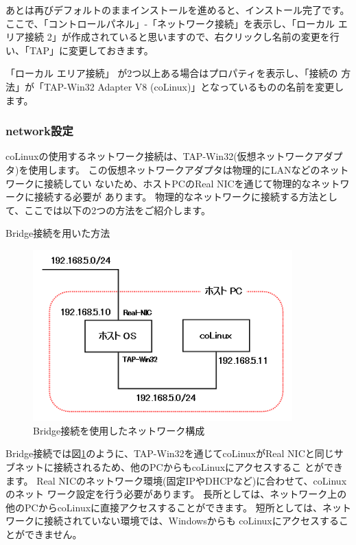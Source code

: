 \documentclass[mingoth,a4paper]{jsarticle}
\begin{document}
あとは再びデフォルトのままインストールを進めると、インストール完了です。
ここで、「コントロールパネル」-「ネットワーク接続」を表示し、「ローカル
エリア接続 2」が作成されていると思いますので、右クリックし名前の変更を行
い、「TAP」に変更しておきます。

「ローカル エリア接続」 が2つ以上ある場合はプロパティを表示し、「接続の
方法」が「TAP-Win32 Adapter V8 (coLinux)」となっているものの名前を変更し
ます。

\subsubsection{network設定}
coLinuxの使用するネットワーク接続は、TAP-Win32(仮想ネットワークアダプタ)を使用します。
この仮想ネットワークアダプタは物理的にLANなどのネットワークに接続してい
ないため、ホストPCのReal NICを通じて物理的なネットワークに接続する必要が
あります。
物理的なネットワークに接続する方法として、ここでは以下の2つの方法をご紹介します。

Bridge接続を用いた方法

\begin{figure}[htbp]
 \begin{center}
  \includegraphics[width=100mm]{image200804/colinux_bridge.png}
 \end{center}
 \caption{Bridge接続を使用したネットワーク構成}
 \label{fig:bridge}
\end{figure}

Bridge接続では図\ref{fig:bridge}のように、TAP-Win32を通じてcoLinuxがReal
NICと同じサブネットに接続されるため、他のPCからもcoLinuxにアクセスするこ
とができます。
Real NICのネットワーク環境(固定IPやDHCPなど)に合わせて、coLinuxのネット
ワーク設定を行う必要があります。
長所としては、ネットワーク上の他のPCからcoLinuxに直接アクセスすることができます。
短所としては、ネットワークに接続されていない環境では、Windowsからも
coLinuxにアクセスすることができません。
\end{document}
